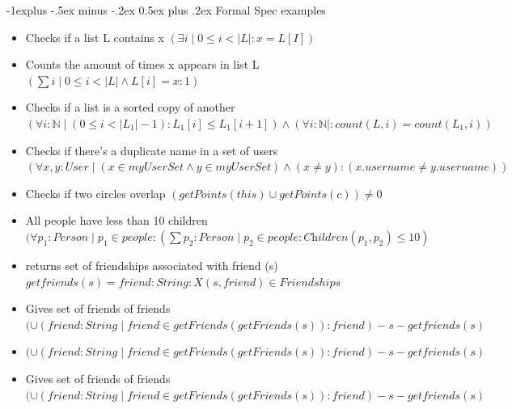 \documentclass[letterpaper, 8pt]{extarticle}
\makeatletter
\renewcommand{\subsection}{\@startsection{subsection}{2}{0mm}%
                                {-1explus -.5ex minus -.2ex}%
                                {0.5ex plus .2ex}%
                                {\normalfont\small\bfseries}}
\makeatother
\begin{document}
\begin{multicols*}{5}
  \subsection{Formal Spec examples}
  \begin{itemize}
  \setlength\itemsep{0.9em}
    \item Checks if a list L contains x
    $(\exists i \mid 0 \leq i < |L| : x = L [I])$
    \item Counts the amount of times x appears in list L
    $(\sum i \mid 0 \leq i < |L| \land L[i] = x: 1)$
    \item Checks if a list is a sorted copy of another
    $(\forall i: \mathbb{N} \mid (0 \leq i < |L_1| - 1): L_1[i] \leq L_1[i + 1]) \land (\forall i : \mathbb{N}|: count(L, i) = count(L_1, i))$
    \item Checks if there's a duplicate name in a set of users
    $(\forall x,y: User \mid (x \in myUserSet \land y \in myUserSet) \land (x \neq y) : (x.username \neq y.username))$
    \item Checks if two circles overlap
    $(getPoints(this) \cup getPoints(c)) \neq 0$
    \item All people have less than 10 children
    $(\forall p_1 : Person \mid p_1 \in people : (\sum p_2 : Person \mid p_2 \in people: \textit{Children}(p_1, p_2) \leq 10)$
    \item returns set of friendships associated with friend (s)
    $ getfriends(s) = {friend:String:X(s,friend)\in Friendships}$
    \item Gives set of friends of friends
    $(\cup (friend : String \mid friend \in getFriends(getFriends(s)) : friend)-{s}-getfriends(s)$
    \item
    $(\cup (friend : String \mid friend \in getFriends(getFriends(s)) : friend)-{s}-getfriends(s)$
    \item Gives set of friends of friends
    $(\cup (friend : String \mid friend \in getFriends(getFriends(s)) : friend)-{s}-getfriends(s)$
    \end{itemize}

\end{multicols*}
\end{document}
